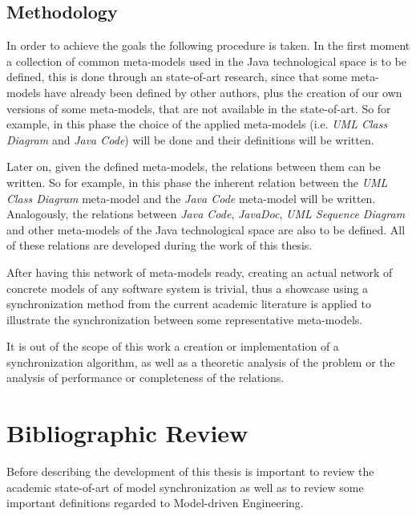 \documentclass[tuberlin,cic,tc,english,noabntcite]{iiufrgs}
\begin{document}
\section{Methodology}
In order to achieve the goals the following procedure is taken. In the first moment a collection of common meta-models used in the Java technological space is to be defined, this is done through an state-of-art research, since that some meta-models have already been defined by other authors, plus the creation of our own versions of some meta-models, that are not available in the state-of-art. So for example, in this phase the choice of the applied meta-models (i.e. \emph{UML Class Diagram} and \emph{Java Code}) will be done and their definitions will be written.

Later on, given the defined meta-models, the relations between them can be written. So for example, in this phase the inherent relation between the \emph{UML Class Diagram} meta-model and the \emph{Java Code} meta-model will be written. Analogously, the relations between \emph{Java Code}, \emph{JavaDoc}, \emph{UML Sequence Diagram} and other meta-models of the Java technological space are also to be defined. All of these relations are developed during the work of this thesis.

After having this network of meta-models ready, creating an actual network of concrete models of any software system is trivial, thus a showcase using a synchronization method from the current academic literature is applied to illustrate the synchronization between some representative meta-models.

It is out of the scope of this work a creation or implementation of a synchronization algorithm, as well as a theoretic analysis of the problem or the analysis of performance or completeness of the relations.

\chapter{Bibliographic Review}
Before describing the development of this thesis is important to review the academic state-of-art of model synchronization as well as to review some important definitions regarded to Model-driven Engineering.

\end{document}

